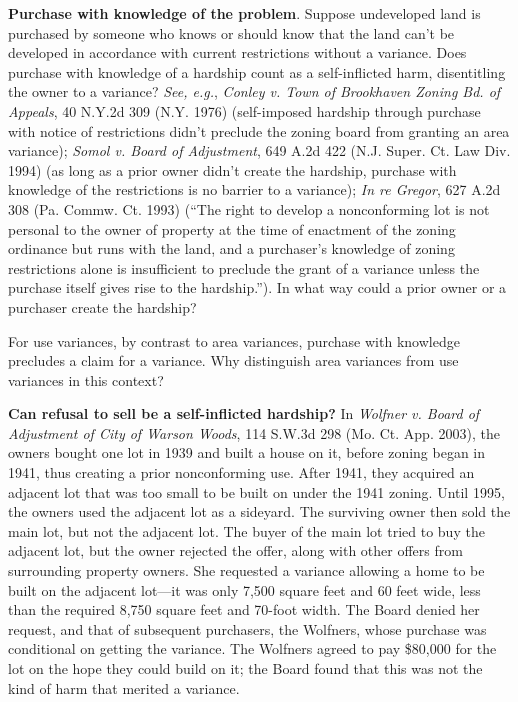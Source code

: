 \item
\textbf{Purchase with knowledge of the problem}. Suppose undeveloped land is
purchased by someone who knows or should know that the land can't be developed
in accordance with current restrictions without a variance. Does purchase with
knowledge of a hardship count as a self-inflicted harm, disentitling the owner
to a variance? \emph{See, e.g.}, \emph{Conley v. Town of Brookhaven Zoning Bd.
of Appeals}, 40 N.Y.2d 309 (N.Y. 1976) (self-imposed hardship through purchase
with notice of restrictions didn't preclude the zoning board from granting an
area variance); \emph{Somol v. Board of Adjustment}, 649 A.2d 422 (N.J. Super.
Ct. Law Div. 1994) (as long as a prior owner didn't create the hardship,
purchase with knowledge of the restrictions is no barrier to a variance);
\emph{In re Gregor}, 627 A.2d 308 (Pa. Commw. Ct. 1993) (``The right to develop
a nonconforming lot is not personal to the owner of property at the time of
enactment of the zoning ordinance but runs with the land, and a purchaser's
knowledge of zoning restrictions alone is insufficient to preclude the grant of
a variance unless the purchase itself gives rise to the hardship.''). In what
way could a prior owner or a purchaser create the hardship? 

For use variances, by contrast to area variances, purchase with knowledge
precludes a claim for a variance. Why distinguish area variances from use
variances in this context? 

\item
\textbf{Can refusal to sell be a self-inflicted hardship?} In \textit{Wolfner v.
Board of Adjustment of City of Warson Woods}, 114 S.W.3d 298 (Mo. Ct. App.
2003), the owners bought one lot in 1939 and built a house on it, before zoning
began in 1941, thus creating a prior nonconforming use. After 1941, they
acquired an adjacent lot that was too small to be built on under the 1941
zoning. Until 1995, the owners used the adjacent lot as a sideyard. The
surviving owner then sold the main lot, but not the adjacent lot. The buyer of
the main lot tried to buy the adjacent lot, but the owner rejected the offer,
along with other offers from surrounding property owners. She requested a
variance allowing a home to be built on the adjacent lot---it was only 7,500
square feet and 60 feet wide, less than the required 8,750 square feet and
70-foot width. The Board denied her request, and that of subsequent purchasers,
the Wolfners, whose purchase was conditional on getting the variance. The
Wolfners agreed to pay \$80,000 for the lot on the hope they could build on it;
the Board found that this was not the kind of harm that merited a variance.

